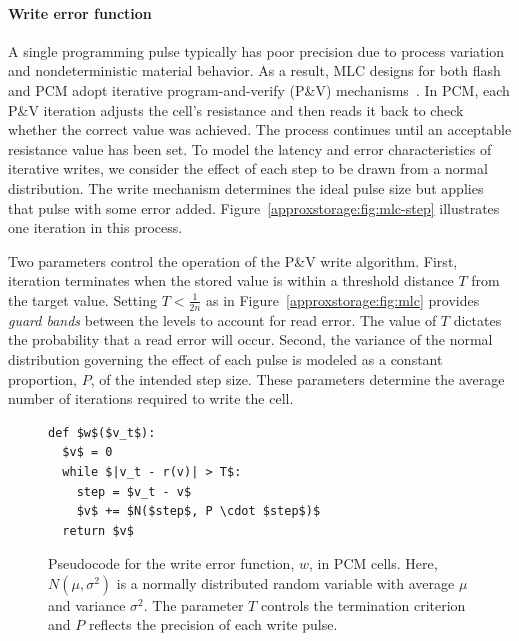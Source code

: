 \paragraph{Write error function}

A single programming pulse typically has poor
precision due to process variation and nondeterministic material
behavior. As a result, MLC designs for both flash and PCM adopt iterative
program-and-verify (P\&V) mechanisms~\cite{morphablepcm,mlcflash}.
In PCM, each P\&V iteration adjusts the cell's resistance and then reads it
back to check whether the
correct value was achieved.
The process continues until an acceptable resistance value has been set.
To model the latency and error characteristics of iterative writes, we
consider the effect of each step to be drawn from a normal
distribution. The write mechanism determines the ideal pulse size but
applies that pulse with some error added.
Figure~\ref{approxstorage:fig:mlc-step} illustrates one iteration in this process.

Two parameters control the operation of the P\&V write algorithm.
First, iteration terminates when the stored value is within a
threshold distance $T$ from the target value. 
Setting $T < \frac{1}{2n}$ as in Figure~\ref{approxstorage:fig:mlc} provides \emph{guard bands} between the
levels to account for read error. The value of $T$ dictates the probability
that a read error will occur.
Second, the variance of
the normal distribution governing the effect of each pulse is modeled
as a constant proportion, $P$, of the intended step size. These parameters
determine the average number of iterations required to write the cell.

\begin{figure}
    \begin{center}
    \begin{minipage}{2in}
    \begin{lstlisting}[mathescape]
def $w$($v_t$):
  $v$ = 0
  while $|v_t - r(v)| > T$:
    step = $v_t - v$
    $v$ += $N($step$, P \cdot $step$)$
  return $v$
\end{lstlisting}
    \end{minipage}
    \end{center}
    \caption{
        Pseudocode for the write error function, $w$, in PCM
        cells.
        Here, $N(\mu, \sigma^2)$ is a normally distributed random
        variable
        with average $\mu$ and variance
        $\sigma^2$. The parameter $T$ controls the termination
        criterion and $P$ reflects the precision of each write pulse.
    }
    \label{approxstorage:fig:pcode-pcm}
\end{figure}

